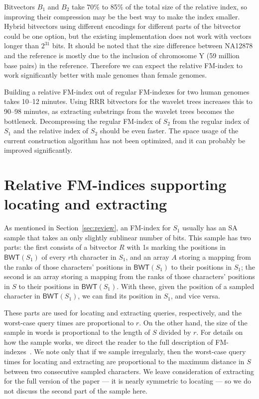 \documentclass{llncs}
\newcommand{\BWT}
  {\ensuremath{\mathsf{BWT}}}
\begin{document}
Bitvectors $B_{1}$ and $B_{2}$ take 70\% to 85\% of the total size of the
relative index, so improving their compression may be the best way to make the index smaller.
Hybrid bitvectors using different encodings for different
parts of the bitvector~\cite{Kaerkkaeinen2014} could be one option, but
the existing implementation does not work with vectors longer than $2^{31}$
bits. It should be noted that the size difference between NA12878 and the reference is mostly due to the inclusion of chromosome Y (59 million base pairs) in the reference. Therefore we can expect the relative FM-index to work significantly better with male genomes than female genomes.


Building a relative FM-index out of regular FM-indexes for two human genomes
takes 10--12 minutes. Using RRR bitvectors for the wavelet trees increases
this to 90--98 minutes, as extracting substrings from the wavelet trees
becomes the bottleneck. Decompressing the regular FM-index of $S_{2}$ from
the regular index of $S_{1}$ and the relative index of $S_{2}$ should be even
faster. The space usage of the current construction algorithm has not been
optimized, and it can probably be improved significantly.


\section{Relative FM-indices supporting locating and extracting}
\label{sec:djamal&giovanni}


As mentioned in Section~\ref{sec:review}, an FM-index for $S_1$ usually has
an SA sample that takes an only slightly sublinear number of bits.  This
sample has two parts: the first consists of a bitvector $R$ with 1s marking
the positions in \(\BWT (S_1)\) of every $r$th character in $S_1$, and an
array $A$ storing a mapping from the ranks of those characters' positions in
\(\BWT (S_1)\) to their positions in $S_1$; the second is an array storing a
mapping from the ranks of those characters' positions in $S$ to their
positions in \(\BWT (S_1)\).  With these, given the position of a sampled
character in \(\BWT (S_1)\), we can find its position in $S_1$, and vice
versa.

These parts are used for locating and extracting queries, respectively, and
the worst-case query times are proportional to $r$.  On the other hand, the
size of the sample in words is proportional to the length of $S$ divided by
$r$.  For details on how the sample works, we direct the reader to the full
description of FM-indexes~\cite{FM05}.  We note only that if we sample
irregularly, then the worst-case query times for locating and extracting are
proportional to the maximum distance in $S$ between two consecutive sampled
characters.  We leave consideration of extracting for the full version of the
paper --- it is nearly symmetric to locating --- so we do not discuss the
second part of the sample here.
\end{document}
